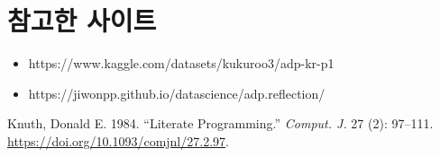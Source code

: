 \documentclass[
  letterpaper,
  DIV=11,
  numbers=noendperiod]{scrreprt}
\providecommand{\tightlist}{%
  \setlength{\itemsep}{0pt}\setlength{\parskip}{0pt}}\usepackage{longtable,booktabs,array}
\newlength{\cslhangindent}
\newlength{\cslentryspacingunit} %
\newenvironment{CSLReferences}[2] %
 {%
  \setlength{\parindent}{0pt}
  \ifodd #1
  \let\oldpar\par
  \def\par{\hangindent=\cslhangindent\oldpar}
  \fi
  \setlength{\parskip}{#2\cslentryspacingunit}
 }%
 {}
\begin{document}
\hypertarget{section}{%
\section*{}\label{section}}

\markright{}

\hypertarget{uxcc38uxace0uxd55c-uxc0acuxc774uxd2b8-2}{%
\chapter*{참고한 사이트}\label{uxcc38uxace0uxd55c-uxc0acuxc774uxd2b8-2}}


\begin{itemize}
\tightlist
\item
  https://www.kaggle.com/datasets/kukuroo3/adp-kr-p1
\item
  https://jiwonpp.github.io/datascience/adp.reflection/
\end{itemize}

\hypertarget{refs}{}
\begin{CSLReferences}{1}{0}
\leavevmode{}%
Knuth, Donald E. 1984. {``Literate Programming.''} \emph{Comput. J.} 27
(2): 97--111. \url{https://doi.org/10.1093/comjnl/27.2.97}.

\end{CSLReferences}
\end{document}
